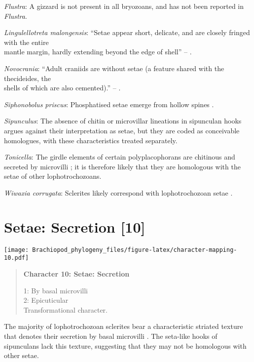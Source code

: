 \documentclass[openany]{book}
\theoremstyle{definition}
\theoremstyle{definition}
\theoremstyle{definition}
\theoremstyle{remark}
\begin{document}
\hypertarget{Flustra-coding-9}{}
\emph{Flustra}: A gizzard is not present in all bryozoans, and has not
been reported in \emph{Flustra}.

\hypertarget{Lingulellotreta_malongensis-coding-9}{}
\emph{Lingulellotreta malongensis}: ``Setae appear short, delicate, and
are closely fringed with the entire\\
mantle margin, hardly extending beyond the edge of shell'' --
\citet{Zhang2005}.

\hypertarget{Novocrania-coding-9}{}
\emph{Novocrania}: ``Adult craniids are without setae (a feature shared
with the thecideides, the\\
shells of which are also cemented).'' -- \citet{Williams2007Supplement}.

\hypertarget{Siphonobolus_priscus-coding-9}{}
\emph{Siphonobolus priscus}: Phosphatised setae emerge from hollow
spines \citep{Popov2009Earlyontogeny}.

\hypertarget{Sipunculus-coding-9}{}
\emph{Sipunculus}: The absence of chitin or microvillar lineations in
sipunculan hooks argues against their interpretation as setae, but they
are coded as conceivable homologues, with these characteristics treated
separately.

\hypertarget{Tonicella-coding-9}{}
\emph{Tonicella}: The girdle elements of certain polyplacophorans are
chitinous and secreted by microvilli
\citep{Fischer1980, Leise1982, Leise1988}; it is therefore likely that
they are homologous with the setae of other lophotrochozoans.

\hypertarget{Wiwaxia_corrugata-coding-9}{}
\emph{Wiwaxia corrugata}: Sclerites likely correspond with
lophotrochozoan setae \citep{Butterfield1990, Smith2014, Zhang2015}.

\section{Setae: Secretion {[}10{]}}\label{setae-secretion-10}

\texttt{[image: Brachiopod\_phylogeny\_files/figure-latex/character-mapping-10.pdf]}

\begin{quote}
\textbf{Character 10: Setae: Secretion}

1: By basal microvilli\\
2: Epicuticular\\
Transformational character.
\end{quote}

The majority of lophotrochozoan sclerites bear a characteristic striated
texture that denotes their secretion by basal microvilli
\citep{Butterfield1990}. The seta-like hooks of sipunculans lack this
texture, suggesting that they may not be homologous with other setae.
\end{document}
